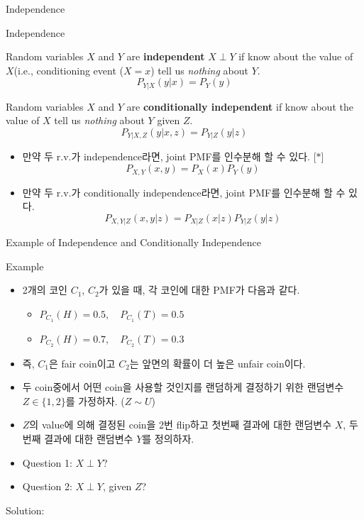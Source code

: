 \documentclass[9pt]{beamer}
\begin{document}
    \begin{section}{Independence}
      \begin{frame}{Independence}
        \begin{definition}[independence]
          Random variables $X$ and $Y$ are \textbf{independent} $X \perp Y$ if know about the value of $X$(i.e., conditioning event ($X=x$) tell us \textit{nothing} about $Y$. 
          $$ P_{Y|X}(y|x) = P_Y(y)$$ 
        \end{definition}
        \begin{definition}
          Random variables $X$ and $Y$ are \textbf{conditionally independent} if know about the value of $X$ tell us \textit{nothing} about $Y$ \alert{given} $Z$. 
          $$ P_{Y|X, Z}(y|x, z) = P_{Y|Z}(y|z)$$ 
        \end{definition}
        \begin{itemize}
          \item 만약 두 r.v.가 independence라면, joint PMF를 인수분해 할 수 있다. [$\ast$]
          $$ P_{X,Y}(x,y) = P_X(x) P_Y(y)$$
          \item 만약 두 r.v.가 conditionally independence라면, joint PMF를 인수분해 할 수 있다.
          $$ P_{X, Y|Z}(x,y|z) = P_{X|Z}(x|z) P_{Y|Z}(y|z)$$
        \end{itemize}
      \end{frame}
      \begin{frame}{Example of Independence and Conditionally Independence}
        \begin{block}{Example}
          \begin{itemize}
            \item 2개의 코인 $C_1$, $C_2$가 있을 때, 각 코인에 대한 PMF가 다음과 같다. 
            \begin{itemize}
              \item $P_{C_1}(H) = 0.5, \quad P_{C_1}(T) = 0.5$
              \item $P_{C_2}(H) = 0.7, \quad P_{C_2}(T) = 0.3$
            \end{itemize}
            \item 즉, $C_1$은 fair coin이고 $C_2$는 앞면의 확률이 더 높은 unfair coin이다.
            \item 두 coin중에서 어떤 coin을 사용할 것인지를 랜덤하게 결정하기 위한 랜덤변수 $Z \in \{1, 2\}$를 가정하자. ($Z \sim U$)
            \item $Z$의 value에 의해 결정된 coin을 2번 flip하고 첫번째 결과에 대한 랜덤변수 $X$, 두번째 결과에 대한 랜덤변수 $Y$를 정의하자.
            \item Question 1: $X \perp Y$?
            \item Question 2: $X \perp Y$, given $Z$?
          \end{itemize}
          \end{block}
          \vspace{0.2cm}
          
          Solution: 
          \vspace{0.8cm}

      \end{frame}
    \end{section}
\end{document}

